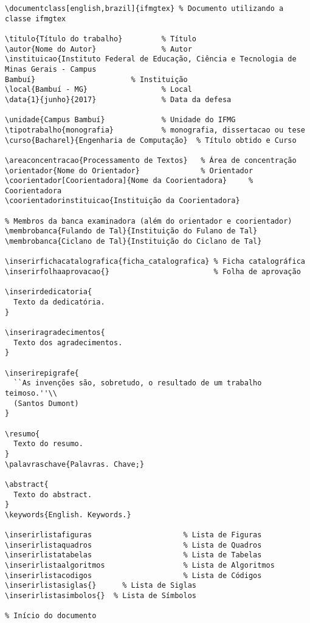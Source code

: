 \begin{Verbatim}[frame=single, fontsize=\scriptsize]
\documentclass[english,brazil]{ifmgtex} % Documento utilizando a classe ifmgtex

\titulo{Título do trabalho}         % Título
\autor{Nome do Autor}               % Autor
\instituicao{Instituto Federal de Educação, Ciência e Tecnologia de Minas Gerais - Campus
Bambuí}                      % Instituição
\local{Bambuí - MG}                 % Local
\data{1}{junho}{2017}               % Data da defesa

\unidade{Campus Bambuí}             % Unidade do IFMG
\tipotrabalho{monografia}           % monografia, dissertacao ou tese
\curso{Bacharel}{Engenharia de Computação}  % Título obtido e Curso

\areaconcentracao{Processamento de Textos}   % Área de concentração
\orientador{Nome do Orientador}              % Orientador
\coorientador[Coorientadora]{Nome da Coorientadora}     % Coorientadora
\coorientadorinstituicao{Instituição da Coorientadora}

% Membros da banca examinadora (além do orientador e coorientador)
\membrobanca{Fulando de Tal}{Instituição do Fulano de Tal}
\membrobanca{Ciclano de Tal}{Instituição do Ciclano de Tal}

\inserirfichacatalografica{ficha_catalografica} % Ficha catalográfica
\inserirfolhaaprovacao{}                        % Folha de aprovação

\inserirdedicatoria{
  Texto da dedicatória.
}

\inseriragradecimentos{
  Texto dos agradecimentos.
}

\inserirepigrafe{
  ``As invenções são, sobretudo, o resultado de um trabalho teimoso.''\\
  (Santos Dumont)
}

\resumo{
  Texto do resumo.
}
\palavraschave{Palavras. Chave;}

\abstract{
  Texto do abstract.
}
\keywords{English. Keywords.}

\inserirlistafiguras                     % Lista de Figuras
\inserirlistaquadros                     % Lista de Quadros
\inserirlistatabelas                     % Lista de Tabelas
\inserirlistaalgoritmos                  % Lista de Algoritmos
\inserirlistacodigos                     % Lista de Códigos
\inserirlistasiglas{}      % Lista de Siglas
\inserirlistasimbolos{}  % Lista de Símbolos

% Início do documento



\end{Verbatim}
